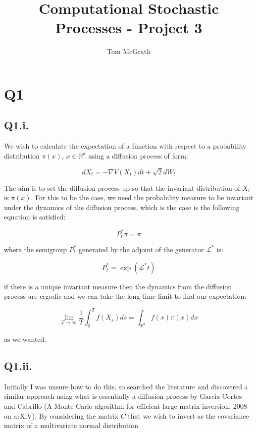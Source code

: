 \documentclass[11pt]{article} %
\title{Computational Stochastic Processes - Project 3}
\author{Tom McGrath}
\begin{document}
\maketitle

\section{Q1}

\subsection{Q1.i.}

We wish to calculate the expectation of a function with respect to a probability distribution $\pi(x)$, $x \in \mathbb{R}^{d}$ using a diffusion process of form:

\begin{equation}
	dX_{t} = -\nabla V(X_{t})dt + \sqrt{2}dW_{t}
\end{equation}

The aim is to set the diffusion process up so that the invariant distribution of $X_{t}$ is $\pi(x)$. For this to be the case, we need the probability measure to be invariant under the dynamics of the diffusion process, which is the case is the following equation is satisfied:

\begin{equation}
	P^{*}_{t} \pi = \pi
\end{equation}

where the semigroup $P^{*}_{t}$ generated by the adjoint of the generator $\mathcal{L}^{*}$ is:

\begin{equation}
	P^{*}_{t} = \exp(\mathcal{L}^{*}t)
\end{equation}

if there is a unique invariant measure then the dynamics from the diffusion process are ergodic and we can take the long-time limit to find our expectation:

\begin{equation}
	\lim_{T\to\infty}\frac{1}{T}\int^{T}_{0}f(X_{s})ds = \int_{\mathbb{R}^{d}}f(x)\pi(x)dx
\end{equation}

as we wanted.

\subsection{Q1.ii.}
Initially I was unsure how to do this, so searched the literature and discovered a similar approach using what is essentially a diffusion process by Garcia-Cortes and Cabrillo (A Monte Carlo algorithm for efficient large matrix inversion, 2008 on arXiV). By considering the matrix $C$ that we wish to invert as the covariance matrix of a multivariate normal distribution
\end{document}
